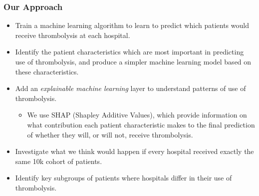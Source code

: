 \begin{frame}
\frametitle{Our Approach}

\small

\begin{itemize}
    \item Train a machine learning algorithm to learn to predict which patients would receive thrombolysis at each hospital.
    \item Identify the patient characteristics which are most important in predicting use of thrombolysis, and produce a simpler machine learning model based on these characteristics.
    \item Add an \emph{explainable machine learning} layer to understand patterns of use of thrombolysis.
    \begin{itemize}
        \footnotesize
        \item We use SHAP (Shapley Additive Values), which provide information on what contribution each patient characteristic makes to the final prediction of whether they will, or will not, receive thrombolysis.
    \end{itemize}
    \item Investigate what we think would happen if every hospital received exactly the same 10k cohort of patients.
    \item Identify key subgroups of patients where hospitals differ in their use of thrombolysis.
\end{itemize}

\vspace{3mm}

\end{frame}